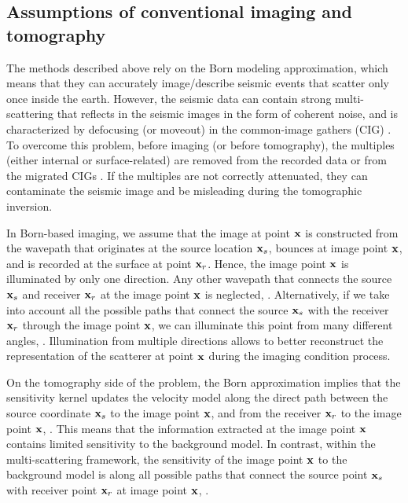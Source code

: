 \subsection{Assumptions of conventional imaging and tomography}
The methods described above rely on the Born modeling approximation, which means that 
they can accurately image/describe seismic events that scatter only once inside the earth. However,
 the seismic data can contain strong multi-scattering  that reflects in the seismic images 
in the form of coherent noise, and is characterized by defocusing (or moveout) in the common-image gathers (CIG) . 
 To overcome this problem, before imaging (or before tomography), the multiples (either internal
or surface-related) are removed from the recorded data \citep{SRME,ArtWeiglein,guitton2005,Herrmann} or from the 
migrated CIGs \citep{SavaGuitton,Wang,Weibull}. If the multiples are not correctly attenuated, 
they can contaminate the seismic image and be misleading during the tomographic inversion. 

In Born-based imaging, we assume that the image at point ${\bf x}$ is constructed from the 
wavepath that originates at the source location ${\bf x}_s$, bounces at image point ${\bf x}$, and is recorded
at the surface at point ${\bf x}_r$. Hence, the image point ${\bf x}$ is illuminated by only 
one direction. 
 Any other wavepath that connects the source ${\bf x}_s$ and receiver ${\bf x}_r$ at
the image point ${\bf x}$ is neglected, . Alternatively, if we take into account
all the possible paths that connect the source ${\bf x}_s$ with the receiver ${\bf x}_r$ through the image point ${\bf x}$,
 we can illuminate this point from many different angles, . Illumination from 
multiple directions allows to better reconstruct the 
representation of the scatterer at point ${\bf x}$ during the imaging condition process. 

On the tomography side of the problem, the Born approximation implies that the sensitivity 
kernel updates the velocity model along the direct path between the source coordinate ${\bf x}_s$ to 
the image point ${\bf x}$, and from the receiver  ${\bf x}_r$ to the image point ${\bf x}$, . This means
that the information extracted at the image point ${\bf x}$ contains limited sensitivity to
the background model. In contrast, within the multi-scattering framework, the sensitivity of the 
image point ${\bf x}$ to the background model is along all possible paths that connect
the source point ${\bf x}_s$ with receiver point ${\bf x}_r$ at image point ${\bf x}$, .

